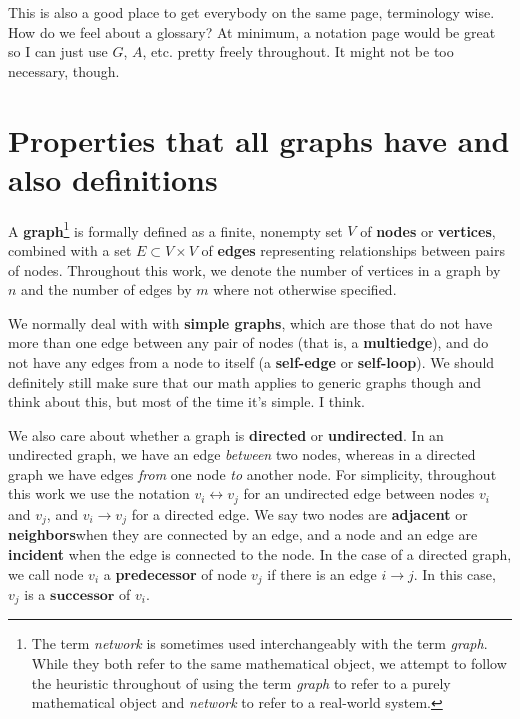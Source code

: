 \documentclass[12pt]{thesis}
\theoremstyle{plain}
\theoremstyle{definition}
\theoremstyle{remark}
\begin{document}
This is also a good place to get everybody on the same page, terminology wise. How do we feel about a glossary? At minimum, a notation page would be great so I can just use $G$, $A$, etc. pretty freely throughout. It might not be too necessary, though.


\section{Properties that all graphs have and also definitions} %


A \textbf{graph}\footnote{The term \textit{network} is sometimes used interchangeably with the term \textit{graph}. While they both refer to the same mathematical object, we attempt to follow the heuristic throughout of using the term \textit{graph} to refer to a purely mathematical object and \textit{network} to refer to a real-world system.} is formally defined as a finite, nonempty set $V$ of \textbf{nodes} or \textbf{vertices}, combined with a set $E\subset V\times V$ of \textbf{edges} representing relationships between pairs of nodes. Throughout this work, we denote the number of vertices in a graph by $n$ and the number of edges by $m$ where not otherwise specified.

We normally deal with with \textbf{simple graphs}, which are those that do not have more than one edge between any pair of nodes (that is, a \textbf{multiedge}), and do not have any edges from a node to itself (a \textbf{self-edge} or \textbf{self-loop}). We should definitely still make sure that our math applies to generic graphs though and think about this, but most of the time it's simple. I think.

We also care about whether a graph is \textbf{directed} or \textbf{undirected}. In an undirected graph, we have an edge \textit{between} two nodes, whereas in a directed graph we have edges \textit{from} one node \textit{to} another node. For simplicity, throughout this work we use the notation $v_i \leftrightarrow v_j$ for an undirected edge between nodes $v_i$ and $v_j$, and $v_i \rightarrow v_j$ for a directed edge. We say two nodes are \textbf{adjacent} or \textbf{neighbors}\index when they are connected by an edge, and a node and an edge are \textbf{incident} when the edge is connected to the node. In the case of a directed graph, we call node $v_i$ a \textbf{predecessor} of node $v_j$ if there is an edge $i\rightarrow j$. In this case, $v_j$ is a $\textbf{successor}$ of $v_i$.
\end{document}
